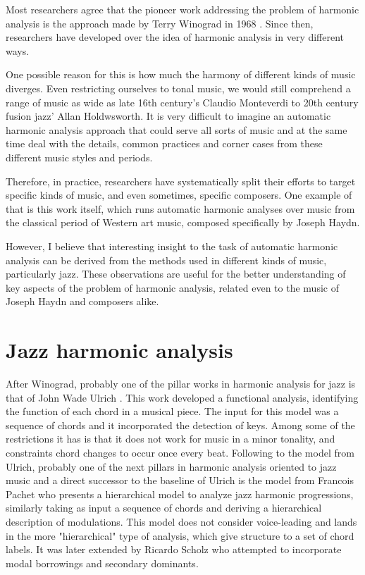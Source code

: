  Most researchers agree that the pioneer work addressing the problem of harmonic analysis is the approach made by Terry Winograd in 1968 \cite{winograd1968linguistics}. Since then, researchers have developed over the idea of harmonic analysis in very different ways.

  One possible reason for this is how much the harmony of different kinds of music diverges. Even restricting ourselves to tonal music, we would still comprehend a range of music as wide as late 16th century's Claudio Monteverdi to 20th century fusion jazz' Allan Holdwsworth. It is very difficult to imagine an automatic harmonic analysis approach that could serve all sorts of music and at the same time deal with the details, common practices and corner cases from these different music styles and periods.

  Therefore, in practice, researchers have systematically split their efforts to target specific kinds of music, and even sometimes, specific composers. One example of that is this work itself, which runs automatic harmonic analyses over music from the classical period of Western art music, composed specifically by Joseph Haydn.

  However, I believe that interesting insight to the task of automatic harmonic analysis can be derived from the methods used in different kinds of music, particularly jazz. These observations are useful for the better understanding of key aspects of the problem of harmonic analysis, related even to the music of Joseph Haydn and composers alike.

\section{Jazz harmonic analysis}
  After Winograd, probably one of the pillar works in harmonic analysis for jazz is that of John Wade Ulrich \cite{ulrich1977analysis}. This work developed a functional analysis, identifying the function of each chord in a musical piece. The input for this model was a sequence of chords and it incorporated the detection of keys. Among some of the restrictions it has is that it does not work for music in a minor tonality, and constraints chord changes to occur once every beat.
  Following to the model from Ulrich, probably one of the next pillars in harmonic analysis oriented to jazz music and a direct successor to the baseline of Ulrich is the model from Francois Pachet \cite{pachet2000computer} who presents a hierarchical model to analyze jazz harmonic progressions, similarly taking as input a sequence of chords and deriving a hierarchical description of modulations. This model does not consider voice-leading and lands in the more "hierarchical" type of analysis, which give structure to a set of chord labels. It was later extended by Ricardo Scholz \cite{scholz2005automating} who attempted to incorporate modal borrowings and secondary dominants.

